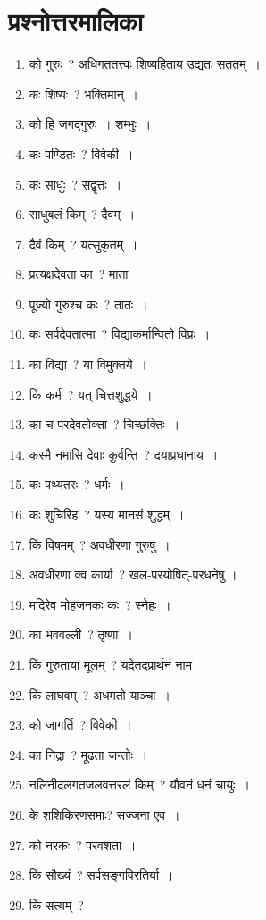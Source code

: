 \documentclass[twoside,12pt,notitlepage]{book}
\begin{document}
\section{प्रश्नोत्तरमालिका}
\thispagestyle{empty}
\begin{enumerate}
\setlength\itemsep{-0.5em}
	\item को गुरुः~? अधिगततत्त्वः शिष्यहिताय उद्यतः सततम्~।
	\item कः शिष्यः~? भक्तिमान्~। 
	\item को हि जगद्गुरुः~। शम्भुः~।
	\item कः पण्डितः~? 
	विवेकी~।\footB\
	\item कः साधुः~? 
	सद्वृत्तः~।\footB\
	\item साधुबलं किम्~? 
	दैवम्~।\footB\
	\item दैवं किम्~? यत्सुकृतम्~।
	\item प्रत्यक्षदेवता का~? माता
	\item पूज्यो गुरुश्च कः~? 
	तातः~।\footB\
	\item कः सर्वदेवतात्मा~? विद्याकर्मान्वितो विप्रः~।
	\item का विद्या~? 
	या विमुक्तये~।\footB\
	\item किं कर्म~? 
	यत् चित्तशुद्धये~।\footB\
	\item का च परदेवतोक्ता~? चिच्छक्तिः~।
	\item कस्मै नमांसि देवाः कुर्वन्ति~? 
	दयाप्रधानाय~।\footB\
	\item कः पथ्यतरः~? 
	धर्मः~।\footB\
	\item कः शुचिरिह~? यस्य मानसं शुद्धम्~।
	\item किं विषमम्~? 
	अवधीरणा गुरुषु~।\footB\
	\item अवधीरणा क्व कार्या~? खल-परयोषित्-परधनेषु ।
	\item मदिरेव  मोहजनकः कः~? 
	स्नेहः~।\footB\
	\item का भववल्ली~? 
	तृष्णा~।\footB\
	\item किं गुरुताया मूलम्~? यदेतदप्रार्थनं नाम~।
	\item किं लाघवम्~? अधमतो याञ्चा~।
	\item को जागर्ति~? विवेकी~।
	\item का निद्रा~? मूढता जन्तोः~।
	\item नलिनीदलगतजलवत्तरलं किम्~? 
	यौवनं धनं चायुः~।\footB\
	\item के शशिकिरणसमाः? 
	सज्जना एव~।\footB\
	\item को नरकः~? परवशता~।\footB\
	\item किं सौख्यं~? 
	सर्वसङ्गविरतिर्या~।\footB\
	\item किं सत्यम्~? 

\end{enumerate}
\end{document}
